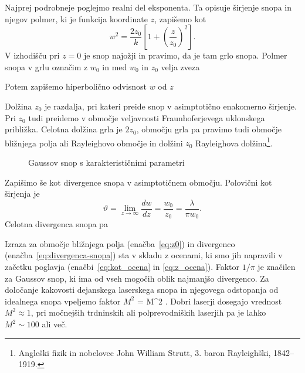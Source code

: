 Najprej podrobneje poglejmo realni del eksponenta. Ta opisuje širjenje snopa in njegov
polmer, ki je funkcija koordinate $z$, zapišemo kot
\begin{equation}
w^{2}=\frac{2z_{0}}{k}\left[1+\left(\frac{z}{z_{0}}\right)^{2}\right].
\end{equation}
V izhodišču pri $z=0$ je snop najožji in pravimo, da je tam grlo snopa. 
Polmer snopa v grlu označim z $w_0$ in med $w_{0}$ in $z_{0}$ velja zveza 

Potem zapišemo hiperbolično odvisnost $w$ od $z$

Dolžina $z_{0}$ je razdalja, pri kateri preide snop v asimptotično enakomerno širjenje.
Pri $z_{0}$ tudi preidemo v območje veljavnosti Fraunhoferjevega uklonskega približka. 
Celotna dolžina grla je $2z_0$, območju grla pa pravimo tudi območje bližnjega polja ali 
Rayleighovo območje in dolžini $z_0$ Rayleighova 
dolžina\footnote{Angleški fizik in nobelovec John William Strutt, 3. baron Rayleighški, 1842--1919.}.
\begin{figure}[h]
\centering
\def\svgwidth{80truemm} 

\caption{Gaussov snop s karakterističnimi parametri}
\label{fig:Gauss}
\end{figure}

Zapišimo še kot divergence snopa v asimptotičnem območju. Polovični kot širjenja je
\begin{equation}
\vartheta=\lim_{z \to \infty} \frac{dw}{dz} = \frac{w_{0}}{z_{0}}=\frac{\lambda}{\pi w_{0}}.\label{eq:divergenca-snopa}
\end{equation}
Celotna divergenca snopa pa

Izraza za območje bližnjega polja (enačba~\ref{eq:z0}) in divergenco 
(enačba~\ref{eq:divergenca-snopa}) sta v skladu z ocenami, ki smo jih 
napravili v začetku poglavja (enačbi~\ref{eq:kot_ocena} in \ref{eq:z_ocena}). Faktor 
$1/\pi$ je značilen za Gaussov snop, ki ima od vseh mogočih oblik 
najmanjšo divergenco. Za določanje kakovosti dejanskega laserskega snopa 
in njegovega odstopanja od idealnega snopa vpeljemo faktor $M^2$
\beq
\theta = M^2 .
\eeq
Dobri laserji dosegajo vrednost $M^2 \approx 1$,
pri močnejših trdninskih ali polprevodniških laserjih pa je lahko $M^2 \sim 100$ ali več. 

